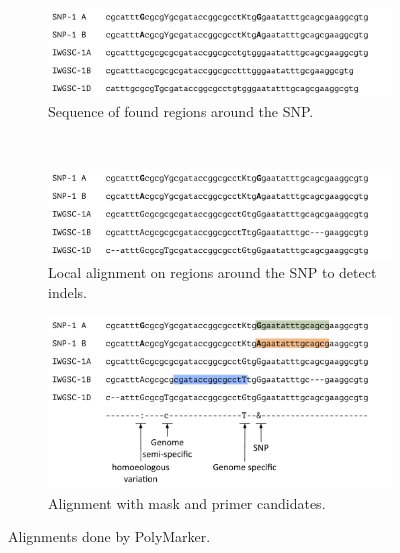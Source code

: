 \begin{figure}
    \begin{subfigure}[b]{0.4\textwidth}
        \includegraphics[width=1\textwidth]{PolyMarker/Figures/aln/scaffoldsFound.pdf}
        \caption{Sequence of found regions around the SNP.}
        \label{fig:poly:globalSequence}
    \end{subfigure}
    ~ %
    \begin{subfigure}[b]{0.4\textwidth}
        \includegraphics[width=1\textwidth]{PolyMarker/Figures/aln/localAlignment.pdf} 
        \caption{Local alignment on regions around the SNP to detect indels.}
        \label{fig:poly:localSequence}
    \end{subfigure}

    \begin{subfigure}[b]{0.8\textwidth}
        \includegraphics[width=1\textwidth]{PolyMarker/Figures/aln/mask.pdf} 
        \caption{Alignment with mask and primer candidates.}
        \label{fig:poly:mask}

    \end{subfigure}
    \caption{Alignments done by PolyMarker.}\label{fig:global}
\end{figure}

